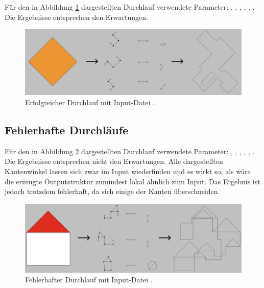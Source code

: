 Für den in Abbildung \ref{fig:rhombus_success} dargestellten Durchlauf verwendete Parameter: , , ,
, , . Die Ergebnisse entsprechen den Erwartungen.
\begin{figure}[H]
    \centering
    \includegraphics[width=\textwidth]{images/rhombus_success.png}
    \caption{Erfolgreicher Durchlauf mit Input-Datei .}
    \label{fig:rhombus_success}
\end{figure}

\subsection{Fehlerhafte Durchläufe}

Für den in Abbildung \ref{fig:house_fail} dargestellten Durchlauf verwendete Parameter: , , ,
, , . Die Ergebnisse entsprechen nicht den Erwartungen. Alle dargestellten Kantenwinkel
lassen sich zwar im Input wiederfinden und es wirkt so, als wäre die erzeugte Outputstruktur zumindest lokal ähnlich zum Input. Das Ergebnis ist jedoch
trotzdem fehlerhaft, da sich einige der Kanten überschneiden.
\begin{figure}[H]
    \centering
    \includegraphics[width=\textwidth]{images/house_fail.png}
    \caption{Fehlerhafter Durchlauf mit Input-Datei .}
    \label{fig:house_fail}
\end{figure}

